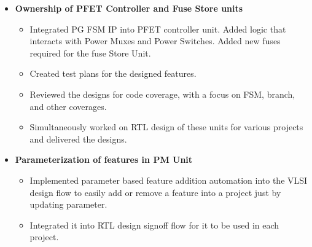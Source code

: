 \documentclass[a4paper,11pt]{article}
\newcommand{\isep}{-2 pt}
\begin{document}
\begin{itemize}
\begin{itemize}
			\item \textbf{Ownership of PFET Controller and Fuse Store units}
				\begin{itemize} \itemsep \isep
					\item Integrated PG FSM IP into PFET controller unit. Added logic that interacts with Power Muxes and Power Switches. Added new fuses required for the fuse Store Unit.
					\item Created test plans for the designed features.
					\item Reviewed the designs for code coverage, with a focus on FSM, branch, and other coverages.
					\item Simultaneously worked on RTL design of these units for various projects and delivered the designs. %
				\end{itemize}
			\item \textbf{Parameterization of features in PM Unit}
			\begin{itemize} \itemsep \isep
				\item Implemented parameter based feature addition automation into the VLSI design flow to easily add or remove a feature into a project just by updating parameter.
				\item Integrated it into RTL design signoff flow for it to be used in each project.
			\end{itemize}

\end{itemize}
\end{itemize}
\end{document}
